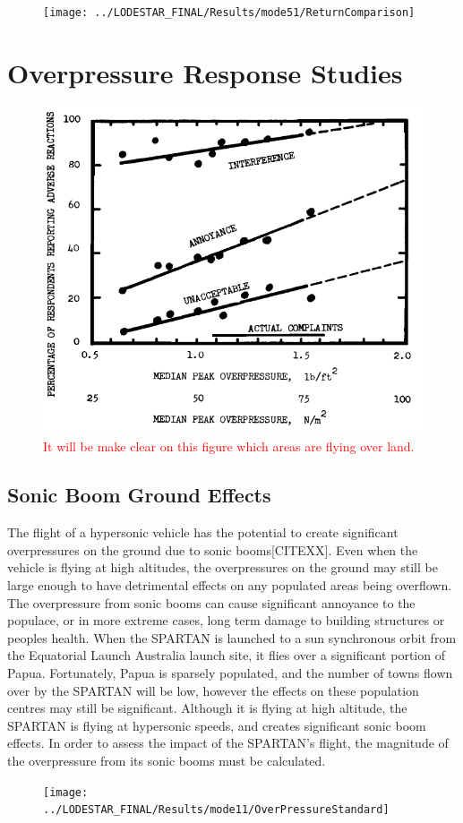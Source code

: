 \begin{figure}[th]
	\centering
	\texttt{[image: ../LODESTAR\_FINAL/Results/mode51/ReturnComparison]}
	\caption{}
	\label{fig:ReturnComparison-}
\end{figure}

\chapter{Overpressure Response Studies}

\begin{figure}[ht]
	\centering
	\includegraphics[width=0.6\linewidth]{figures/6_FlyBack/OverPressureResponse}
	\caption{\textcolor{red}{It will be make clear on this figure which areas are flying over land. }}
	\label{fig:OverPressureResponse}
\end{figure}



\section{Sonic Boom Ground Effects}

The flight of a hypersonic vehicle has the potential to create significant overpressures on the ground due to sonic booms[CITEXX]. Even when the vehicle is flying at high altitudes, the overpressures on the ground may still be large enough to have detrimental effects on any populated areas being overflown. The overpressure from sonic booms can cause significant annoyance to the populace, or in more extreme cases, long term damage to building structures or peoples health. 
When the SPARTAN is launched to a sun synchronous orbit from the Equatorial Launch Australia launch site, it flies over a significant portion of Papua. Fortunately, Papua is sparsely populated, and the number of towns flown over by the SPARTAN will be low, however the effects on these population centres may still be significant. Although it is flying at high altitude, the SPARTAN is flying at hypersonic speeds, and creates significant sonic boom effects. In order to assess the impact of the SPARTAN's flight, the magnitude of the overpressure from its sonic booms must be calculated. 
\begin{figure}[ht]
	\centering
	\texttt{[image: ../LODESTAR\_FINAL/Results/mode11/OverPressureStandard]}
	\caption{}
	\label{fig:OverPressureStandard}
\end{figure}

